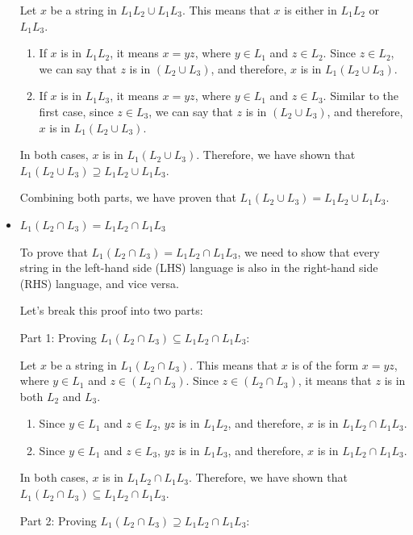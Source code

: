 \documentclass{article}
\begin{document}
\begin{itemize}
  Let $x$ be a string in $L_1L_2 \cup L_1L_3$. This means that $x$ is either in $L_1L_2$ or $L_1L_3$.
  
  \begin{enumerate}
    \item If $x$ is in $L_1L_2$, it means $x = yz$, where $y \in L_1$ and $z \in L_2$. Since $z \in L_2$, we can say that $z$ is in $(L_2 \cup L_3)$, and therefore, $x$ is in $L_1(L_2 \cup L_3)$.
    \item If $x$ is in $L_1L_3$, it means $x = yz$, where $y \in L_1$ and $z \in L_3$. Similar to the first case, since $z \in L_3$, we can say that $z$ is in $(L_2 \cup L_3)$, and therefore, $x$ is in $L_1(L_2 \cup L_3)$.
  \end{enumerate}
  
  In both cases, $x$ is in $L_1(L_2 \cup L_3)$. Therefore, we have shown that $L_1(L_2 \cup L_3) \supseteq L_1L_2 \cup L_1L_3$.
  
  Combining both parts, we have proven that $L_1(L_2 \cup L_3) = L_1L_2 \cup L_1L_3$.

  \item $L_1(L_2 \cap L_3) = L_1L_2 \cap L_1L_3$
  
  To prove that $L_1(L_2 \cap L_3) = L_1L_2 \cap L_1L_3$, we need to show that every string in the left-hand side (LHS) language is also in the right-hand side (RHS) language, and vice versa.

  Let's break this proof into two parts:

  Part 1: Proving $L_1(L_2 \cap L_3) \subseteq L_1L_2 \cap L_1L_3$:

  Let $x$ be a string in $L_1(L_2 \cap L_3)$. This means that $x$ is of the form $x = yz$, where $y \in L_1$ and $z \in (L_2 \cap L_3)$. Since $z \in (L_2 \cap L_3)$, it means that $z$ is in both $L_2$ and $L_3$.

  \begin{enumerate}
    \item Since $y \in L_1$ and $z \in L_2$, $yz$ is in $L_1L_2$, and therefore, $x$ is in $L_1L_2 \cap L_1L_3$.
    \item Since $y \in L_1$ and $z \in L_3$, $yz$ is in $L_1L_3$, and therefore, $x$ is in $L_1L_2 \cap L_1L_3$.
  \end{enumerate}
  

  In both cases, $x$ is in $L_1L_2 \cap L_1L_3$. Therefore, we have shown that $L_1(L_2 \cap L_3) \subseteq L_1L_2 \cap L_1L_3$.

  Part 2: Proving $L_1(L_2 \cap L_3) \supseteq L_1L_2 \cap L_1L_3$:


\end{itemize}
\end{document}
